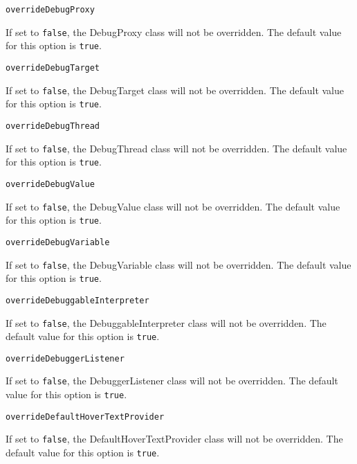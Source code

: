 \noindent\texttt{overrideDebugProxy}
\begin{myindentpar}{1cm}
If set to \texttt{false}, the DebugProxy class will not be overridden. The default value for this option is \texttt{true}.
\end{myindentpar}

\noindent\texttt{overrideDebugTarget}
\begin{myindentpar}{1cm}
If set to \texttt{false}, the DebugTarget class will not be overridden. The default value for this option is \texttt{true}.
\end{myindentpar}

\noindent\texttt{overrideDebugThread}
\begin{myindentpar}{1cm}
If set to \texttt{false}, the DebugThread class will not be overridden. The default value for this option is \texttt{true}.
\end{myindentpar}

\noindent\texttt{overrideDebugValue}
\begin{myindentpar}{1cm}
If set to \texttt{false}, the DebugValue class will not be overridden. The default value for this option is \texttt{true}.
\end{myindentpar}

\noindent\texttt{overrideDebugVariable}
\begin{myindentpar}{1cm}
If set to \texttt{false}, the DebugVariable class will not be overridden. The default value for this option is \texttt{true}.
\end{myindentpar}

\noindent\texttt{overrideDebuggableInterpreter}
\begin{myindentpar}{1cm}
If set to \texttt{false}, the DebuggableInterpreter class will not be overridden. The default value for this option is \texttt{true}.
\end{myindentpar}

\noindent\texttt{overrideDebuggerListener}
\begin{myindentpar}{1cm}
If set to \texttt{false}, the DebuggerListener class will not be overridden. The default value for this option is \texttt{true}.
\end{myindentpar}

\noindent\texttt{overrideDefaultHoverTextProvider}
\begin{myindentpar}{1cm}
If set to \texttt{false}, the DefaultHoverTextProvider class will not be overridden. The default value for this option is \texttt{true}.
\end{myindentpar}

